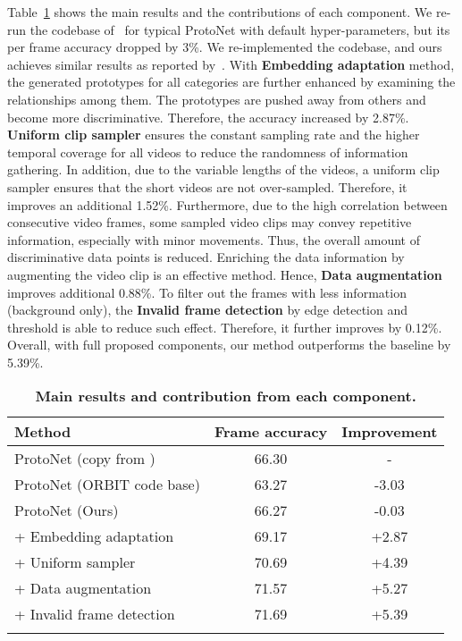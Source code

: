  Table~\ref{results} shows the main results and the contributions of each component. We re-run the codebase of~\cite{massiceti2021orbit} for typical ProtoNet with default hyper-parameters, but its per frame accuracy dropped by 3\%. We re-implemented the codebase, and ours achieves similar results as reported by~\cite{bronskill2021memory}. With \textbf{Embedding adaptation} method, the generated prototypes for all categories are further enhanced by examining the relationships among them. The prototypes are pushed away from others and become more discriminative. Therefore, the accuracy increased by 2.87\%. \textbf{Uniform clip sampler} ensures the constant sampling rate and the higher temporal coverage for all videos to reduce the randomness of information gathering. In addition, due to the variable lengths of the videos, a uniform clip sampler ensures that the short videos are not over-sampled. Therefore, it improves an additional 1.52\%. Furthermore, due to the high correlation between consecutive video frames, some sampled video clips may convey repetitive information, especially with minor movements. Thus, the overall amount of discriminative data points is reduced. Enriching the data information by augmenting the video clip is an effective method. Hence, \textbf{Data augmentation} improves additional 0.88\%. To filter out the frames with less information (background only), the \textbf{Invalid frame detection} by edge detection and threshold is able to reduce such effect. Therefore, it further improves by 0.12\%. Overall, with full proposed components, our method outperforms the baseline by 5.39\%.

\begin{table}
\small
\centering
\setlength{\tabcolsep}{4pt}
\caption{\textbf{Main results and contribution from each component.}} 
\begin{tabular}{lcc}
\Xhline{1pt}
Method & Frame accuracy & Improvement\\ 
\hline
ProtoNet (copy from \cite{bronskill2021memory}) & 66.30  & - \\
ProtoNet (ORBIT code base) & 63.27 & -3.03\\
\Xhline{1pt}
ProtoNet (Ours) & 66.27 & -0.03 \\
+ Embedding adaptation & 69.17 & +2.87 \\
+ Uniform sampler & 70.69 & +4.39 \\
+ Data augmentation & 71.57& +5.27\\
+ Invalid frame detection & 71.69 & +5.39\\
 \Xhline{1pt}
\end{tabular}
\label{results}
\end{table}


